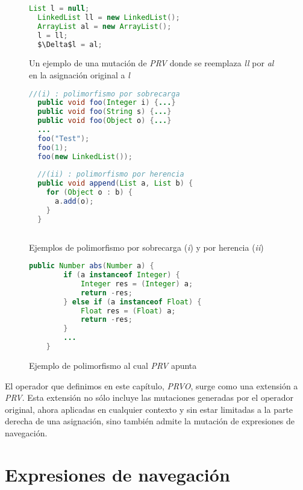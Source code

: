 \begin{figure}
	\centering
	\begin{lstlisting}[mathescape=true, language=Java, extendedchars=true,basicstyle={}]
  List l = null;
  LinkedList ll = new LinkedList();
  ArrayList al = new ArrayList();
  l = ll;
  $\Delta$l = al;
	\end{lstlisting}
	\caption{Un ejemplo de una mutaci\'on de \emph{PRV} donde se reemplaza \emph{ll} por \emph{al} en la asignaci\'on original a \emph{l}}
	\label{figures.examples.PRV}
\end{figure}

\begin{figure}
	\centering
	\begin{lstlisting}[mathescape=true, language=Java, extendedchars=true,basicstyle={}]
  //(i) : polimorfismo por sobrecarga
  public void foo(Integer i) {...}
  public void foo(String s) {...}
  public void foo(Object o) {...}
  ...
  foo("Test");
  foo(1);
  foo(new LinkedList());
  
  //(ii) : polimorfismo por herencia
  public void append(List a, List b) {
    for (Object o : b) {
      a.add(o);
    }
  }
  
	\end{lstlisting}
	\caption{Ejemplos de polimorfismo por sobrecarga (\emph{i}) y por herencia (\emph{ii})}
	\label{figures.examples.polimorfism}
\end{figure}

\begin{figure}
	\centering
	\begin{lstlisting}[mathescape=true, language=Java, extendedchars=true,tabsize=3,basicstyle={}]
	public Number abs(Number a) {
		if (a instanceof Integer) {
			Integer res = (Integer) a;
			return -res;
		} else if (a instanceof Float) {
			Float res = (Float) a;
			return -res;
		}
		...
	}
	\end{lstlisting}
	\caption{Ejemplo de polimorfismo al cual \emph{PRV} apunta}
	\label{figures.examples.polimorfismPRV}
\end{figure}

El operador que definimos en este cap\'itulo, \emph{PRVO}, surge como una extensi\'on a \emph{PRV}. Esta extensi\'on no s\'olo incluye las mutaciones generadas por el operador original, ahora aplicadas en cualquier contexto y sin estar limitadas a la parte derecha de una asignaci\'on, sino tambi\'en admite la mutaci\'on de expresiones de navegaci\'on.


\section{Expresiones de navegaci\'on}
\label{sec:prvo.navigationalExpressions}

